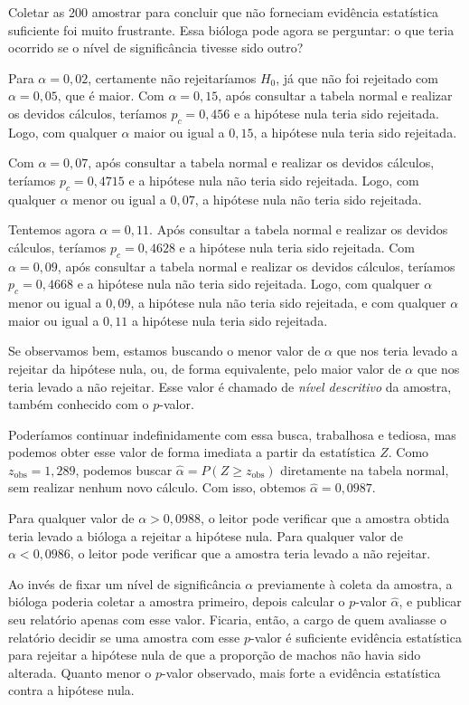 \documentclass[12pt,a4paper]{article}
\theoremstyle{plain}
\theoremstyle{definition}
\theoremstyle{remark}
\begin{document}
Coletar as 200 amostrar para concluir que não forneciam evidência estatística suficiente foi muito frustrante.
Essa bióloga pode agora se perguntar: o que teria ocorrido se o nível de significância tivesse sido outro?

Para $\alpha=0,02$, certamente não rejeitaríamos $H_0$, já que não foi rejeitado com $\alpha=0,05$, que é maior.
Com $\alpha=0,15$, após consultar a tabela normal e realizar os devidos cálculos, teríamos $p_c = 0,456$ e a hipótese nula teria sido rejeitada.
Logo, com qualquer $\alpha$ maior ou igual a $0,15$, a hipótese nula teria sido rejeitada.

Com $\alpha=0,07$, após consultar a tabela normal e realizar os devidos cálculos, teríamos $p_c = 0,4715$ e a hipótese nula não teria sido rejeitada.
Logo, com qualquer $\alpha$ menor ou igual a $0,07$, a hipótese nula não teria sido rejeitada.

Tentemos agora $\alpha=0,11$.
Após consultar a tabela normal e realizar os devidos cálculos, teríamos $p_c = 0,4628$ e a hipótese nula teria sido rejeitada.
Com $\alpha=0,09$, após consultar a tabela normal e realizar os devidos cálculos, teríamos $p_c = 0,4668$ e a hipótese nula não teria sido rejeitada.
Logo, com qualquer $\alpha$ menor ou igual a $0,09$, a hipótese nula não teria sido rejeitada, e com qualquer $\alpha$ maior ou igual a $0,11$ a hipótese nula teria sido rejeitada.

Se observamos bem, estamos buscando o menor valor de $\alpha$ que nos teria levado a rejeitar da hipótese nula, ou, de forma equivalente, pelo maior valor de $\alpha$ que nos teria levado a não rejeitar.
Esse valor é chamado de \emph{nível descritivo} da amostra, também conhecido com o $p$-valor.

Poderíamos continuar indefinidamente com essa busca, trabalhosa e tediosa, mas podemos obter esse valor de forma imediata a partir da estatística $Z$.
Como $z_{\mathrm{obs}}=1,289$, podemos buscar $\hat{\alpha}=P(Z \geq z_{\mathrm{obs}})$ diretamente na tabela normal, sem realizar nenhum novo cálculo.
Com isso, obtemos $\hat{\alpha}=0,0987$.

Para qualquer valor de $\alpha>0,0988$, o leitor pode verificar que a amostra obtida teria levado a bióloga a rejeitar a hipótese nula.
Para qualquer valor de $\alpha<0,0986$, o leitor pode verificar que a amostra teria levado a não rejeitar.

Ao invés de fixar um nível de significância $\alpha$ previamente à coleta da amostra, a bióloga poderia coletar a amostra primeiro, depois calcular o $p$-valor $\hat{\alpha}$, e publicar seu relatório apenas com esse valor. Ficaria, então, a cargo de quem avaliasse o relatório decidir se uma amostra com esse $p$-valor é suficiente evidência estatística para rejeitar a hipótese nula de que a proporção de machos não havia sido alterada.
Quanto menor o $p$-valor observado, mais forte a evidência estatística contra a hipótese nula.
\end{document}
